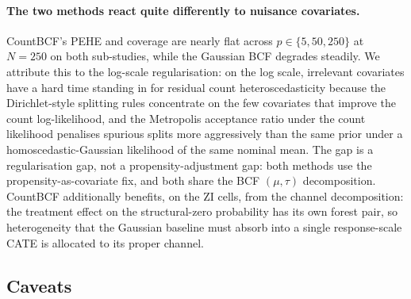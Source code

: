 \documentclass[11pt]{article}
\theoremstyle{plain}
\theoremstyle{definition}
\theoremstyle{remark}
\begin{document}
\paragraph{The two methods react quite differently to nuisance
covariates.} CountBCF's PEHE and coverage are nearly flat across
$p \in \{5, 50, 250\}$ at $N = 250$ on both sub-studies, while the
Gaussian BCF degrades steadily. We attribute this to the
log-scale regularisation: on the log scale, irrelevant covariates
have a hard time standing in for residual count heteroscedasticity
because the Dirichlet-style splitting rules concentrate on the few
covariates that improve the count log-likelihood, and the
Metropolis acceptance ratio under the count likelihood penalises
spurious splits more aggressively than the same prior under a
homoscedastic-Gaussian likelihood of the same nominal mean. The
gap is a regularisation gap, not a propensity-adjustment gap:
both methods use the propensity-as-covariate fix, and both share
the BCF $(\mu, \tau)$ decomposition. CountBCF additionally
benefits, on the ZI cells, from the channel decomposition: the
treatment effect on the structural-zero probability has its own
forest pair, so heterogeneity that the Gaussian baseline must
absorb into a single response-scale CATE is allocated to its
proper channel.

\subsection{Caveats}\label{sec:emp-caveats}
\end{document}
